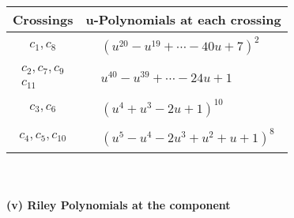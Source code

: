 \documentclass[1p]{elsarticle_modified}
\theoremstyle{definition}
\begin{document}
\begin{tabular}{m{50pt}|m{274pt}}
Crossings & \hspace{64pt}u-Polynomials at each crossing \\
\hline $$\begin{aligned}c_{1},c_{8}\end{aligned}$$&$\begin{aligned}
&(u^{20}- u^{19}+\cdots-40 u+7)^{2}
\end{aligned}$\\
\hline $$\begin{aligned}c_{2},c_{7},c_{9}\\c_{11}\end{aligned}$$&$\begin{aligned}
&u^{40}- u^{39}+\cdots-24 u+1
\end{aligned}$\\
\hline $$\begin{aligned}c_{3},c_{6}\end{aligned}$$&$\begin{aligned}
&(u^4+u^3-2 u+1)^{10}
\end{aligned}$\\
\hline $$\begin{aligned}c_{4},c_{5},c_{10}\end{aligned}$$&$\begin{aligned}
&(u^5- u^4-2 u^3+u^2+u+1)^8
\end{aligned}$\\
\hline
\end{tabular}\\~\\
\newpage\renewcommand{\arraystretch}{1}
\flushleft \textbf{(v) Riley Polynomials at the component}\newline \\
\end{document}
